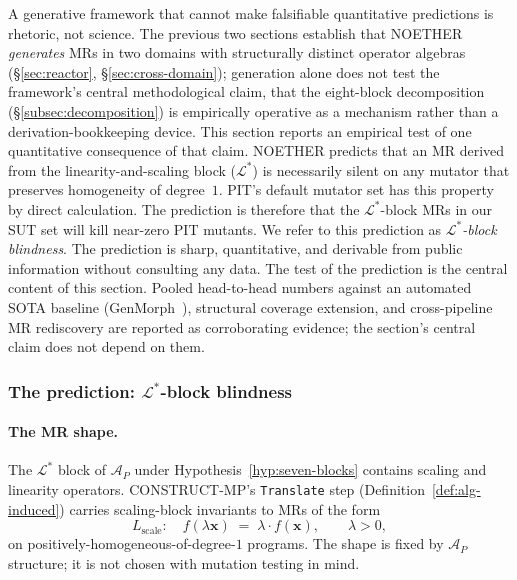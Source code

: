 \documentclass[acmsmall, screen]{acmart}
\begin{document}
A generative framework that cannot make falsifiable quantitative
predictions is rhetoric, not science. The previous two sections
establish that NOETHER \emph{generates} MRs in two domains with
structurally distinct operator algebras (\S\ref{sec:reactor},
\S\ref{sec:cross-domain}); generation alone does not test the
framework's central methodological claim, that the eight-block
decomposition (\S\ref{subsec:decomposition}) is empirically operative
as a mechanism rather than a derivation-bookkeeping device. This
section reports an empirical test of one quantitative consequence of
that claim. NOETHER predicts that an MR derived from the
linearity-and-scaling block ($\mathcal{L}^{*}$) is necessarily silent
on any mutator that preserves homogeneity of degree~$1$. PIT's default
mutator set has this property by direct calculation. The prediction
is therefore that the $\mathcal{L}^{*}$-block MRs in our SUT set will
kill near-zero PIT mutants. We refer to this prediction as
\emph{$\mathcal{L}^{*}$-block blindness}. The prediction is sharp,
quantitative, and derivable from public information without consulting
any data. The test of the prediction is the central content of this
section. Pooled head-to-head numbers against an automated SOTA
baseline (GenMorph~\cite{GenMorph2024}), structural coverage
extension, and cross-pipeline MR rediscovery are reported as
corroborating evidence; the section's central claim does not depend
on them.

\subsubsection{The prediction: \texorpdfstring{$\mathcal{L}^{*}$}{L*}-block blindness}
\label{subsec:l-blindness-derivation}

\paragraph{The MR shape.}
The $\mathcal{L}^{*}$ block of $\mathcal{A}_P$ under
Hypothesis~\ref{hyp:seven-blocks} contains scaling and linearity
operators. CONSTRUCT-MP's \texttt{Translate} step
(Definition~\ref{def:alg-induced}) carries scaling-block invariants
to MRs of the form
\begin{equation}
\label{eq:l-scale-shape}
L_{\mathrm{scale}}: \quad f(\lambda \mathbf{x}) \;=\; \lambda \cdot f(\mathbf{x}),
\qquad \lambda > 0,
\end{equation}
on positively-homogeneous-of-degree-$1$ programs. The shape is fixed
by $\mathcal{A}_P$ structure; it is not chosen with mutation testing
in mind.
\end{document}
